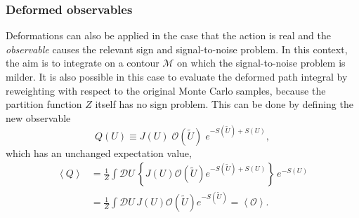 \documentclass[12pt]{article}
\begin{document}
\subsubsection{Deformed observables}
Deformations can also be applied in the case that the action is real and the \emph{observable} causes the relevant sign and signal-to-noise problem.
In this context, the aim is to integrate on a contour $\mathcal{M}$ on which the signal-to-noise problem is milder. 
It is also possible in this case to evaluate the deformed path integral by reweighting with respect to the original Monte Carlo samples, because the partition function $Z$ itself has no sign problem. This can be done by defining the new observable
\begin{equation}
Q(U) \equiv J(U) \; \mathcal{O}(\tilde{U}) \; e^{-S(\tilde{U}) + S(U)},
\end{equation}
which has an unchanged expectation value,
\begin{equation} \label{eq:Qave}
\begin{split}
    \left<Q\right> &= \frac{1}{Z} \int \mathcal{D}U \, \left\{ J(U) \mathcal{O}(\tilde{U}) e^{-S(\tilde{U}) + S(U)} \right\} \, e^{-S(U)} \\
    &= \frac{1}{Z} \int \mathcal{D}U \, J(U) \mathcal{O}(\tilde{U}) e^{-S(\tilde{U})} = \left<\mathcal{O}\right>.
\end{split}
\end{equation}
\end{document}
